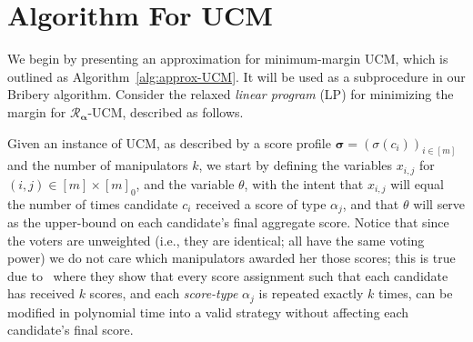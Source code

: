 \documentclass[letterpaper]{article} %
\theoremstyle{definition}
\newcommand\vecgreek{\bm}
\newcommand{\veca}{\vecgreek{\alpha}}
\newcommand{\vecs}{\vecgreek{\sigma}}
\newcommand{\Ra}{\mathcal{R}_{\veca}}
\begin{document}
\section{Algorithm For UCM}
We begin by presenting an approximation for minimum-margin UCM, which is outlined as Algorithm~\ref{alg:approx-UCM}. It will be used as a subprocedure in our Bribery algorithm.
Consider the relaxed \emph{linear program} (LP) for minimizing the margin for $\Ra$-UCM, described as follows.  

Given an instance of UCM, as described  by a score profile $\vecs=(\sigma(c_i))_{i \in [m]}$ and the number of manipulators $k$, 
we start by defining the variables $x_{i,j}$ for $(i,j) \in [m]\times[m]_0$, and the variable $\theta$, with the intent that $x_{i,j}$ will equal the number of times candidate $c_i$ received a score of type $\alpha_j$, and that $\theta$ will serve as the upper-bound on each candidate's final aggregate score. Notice that since the voters are unweighted (i.e., they are identical; all have the same voting power) we do not care which manipulators awarded her those scores; this is true due to~\cite[Theorem~7]{DBLP:journals/ai/DaviesKNWX14} where they show that every score assignment such that each candidate has received $k$ scores, and each \emph{score-type} $\alpha_j$  is repeated exactly $k$ times, can be modified in polynomial time
into a valid strategy without affecting each candidate's final score.
\end{document}

